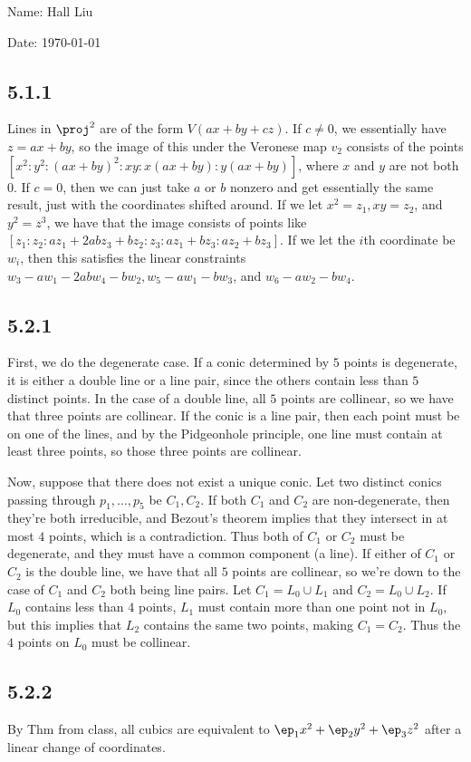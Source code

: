 \documentclass{article}
\begin{document}
Name: Hall Liu

Date: \today 
\vspace{1.5cm}
\subsection*{5.1.1}
Lines in $\proj^2$ are of the form $V(ax+by+cz)$. If $c\neq0$, we essentially have $z=ax+by$, so the image of this under the Veronese map $v_2$ consists of the points $[x^2:y^2:(ax+by)^2:xy:x(ax+by):y(ax+by)]$, where $x$ and $y$ are not both $0$. If $c=0$, then we can just take $a$ or $b$ nonzero and get essentially the same result, just with the coordinates shifted around. If we let $x^2=z_1,xy=z_2$, and $y^2=z^3$, we have that the image consists of points like $[z_1:z_2:az_1+2abz_3+bz_2:z_3:az_1+bz_3:az_2+bz_3]$. If we let the $i$th coordinate be $w_i$, then this satisfies the linear constraints $w_3-aw_1-2abw_4-bw_2,w_5-aw_1-bw_3$, and $w_6-aw_2-bw_4$.
\subsection*{5.2.1}
First, we do the degenerate case. If a conic determined by $5$ points is degenerate, it is either a double line or a line pair, since the others contain less than $5$ distinct points. In the case of a double line, all $5$ points are collinear, so we have that three points are collinear. If the conic is a line pair, then each point must be on one of the lines, and by the Pidgeonhole principle, one line must contain at least three points, so those three points are collinear.

Now, suppose that there does not exist a unique conic. Let two distinct conics passing through $p_1,\ldots,p_5$ be $C_1,C_2$. If both $C_1$ and $C_2$ are non-degenerate, then they're both irreducible, and Bezout's theorem implies that they intersect in at most $4$ points, which is a contradiction. Thus both of $C_1$ or $C_2$ must be degenerate, and they must have a common component (a line). If either of $C_1$ or $C_2$ is the double line, we have that all $5$ points are collinear, so we're down to the case of $C_1$ and $C_2$ both being line pairs. Let $C_1=L_0\cup L_1$ and $C_2=L_0\cup L_2$. If $L_0$ contains less than $4$ points, $L_1$ must contain more than one point not in $L_0$, but this implies that $L_2$ contains the same two points, making $C_1=C_2$. Thus the $4$ points on $L_0$ must be collinear.
\subsection*{5.2.2}
By Thm from class, all cubics are equivalent to $\ep_1x^2+\ep_2y^2+\ep_3z^2$ after a linear change of coordinates. 
\end{document}
